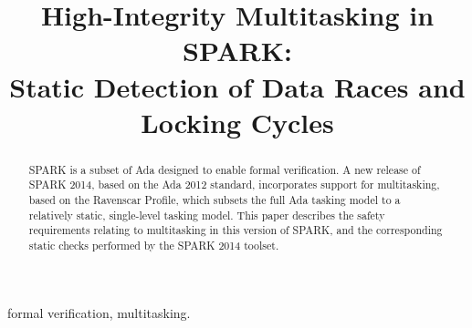 \documentclass[10pt,conference,compsocconf]{IEEEtran}
\begin{document}
\title{High-Integrity Multitasking in SPARK:\\
  Static Detection of Data Races and Locking Cycles}

\author{
\and
{}
\and
{}
}

\maketitle

%
%

\begin{abstract}
  SPARK is a subset of Ada designed to enable formal verification. A new
  release of SPARK 2014, based on the Ada 2012 standard, incorporates
  support for multitasking, based on the Ravenscar Profile, which subsets
  the full Ada tasking model to a relatively static, single-level tasking
  model. This paper describes the safety requirements relating to
  multitasking in this version of SPARK, and the corresponding static
  checks performed by the SPARK 2014 toolset.
\end{abstract}


\begin{IEEEkeywords}

  formal verification,
  multitasking.
\end{IEEEkeywords}





\end{document}
